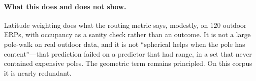 \paragraph{What this does and does not show.}
Latitude weighting does what the routing metric says, modestly, on $120$
outdoor ERPs, with occupancy as a sanity check rather than an outcome.
It is not a large pole-walk on real outdoor data, and it is not
``spherical helps when the pole has content''---that prediction failed
on a predictor that had range, in a set that never contained expensive
poles. The geometric term remains principled. On this corpus it is
nearly redundant.

